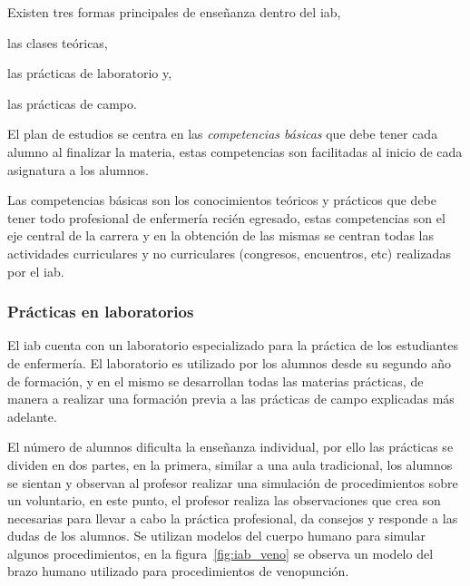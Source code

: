 Existen tres formas principales de enseñanza dentro del \Gls{iab}, 
\begin{enumerate*}[label=\itshape\alph*\upshape.]
\item las clases teóricas, 
\item las prácticas de laboratorio y, 
\item las prácticas de campo.
\end{enumerate*}


El plan de estudios se centra en las \emph{competencias básicas} que debe tener
cada alumno al finalizar la materia, estas competencias son facilitadas al
inicio de cada asignatura a los alumnos.

Las competencias básicas son los conocimientos teóricos y prácticos que debe
tener todo profesional de enfermería recién egresado, estas competencias son el
eje central de la carrera y en la obtención de las mismas se centran todas las
actividades curriculares y no curriculares (congresos, encuentros, etc)
realizadas por el \Gls{iab}.



\subsubsection{Prácticas en laboratorios}
\label{sec:practica_lab}

El \Gls{iab} cuenta con un laboratorio especializado para la práctica de los
estudiantes de enfermería. El laboratorio es utilizado por los alumnos 
desde su segundo año de formación, y en el mismo se desarrollan todas las materias 
prácticas, de manera a realizar una formación previa a las prácticas de campo 
explicadas más adelante.

El número de alumnos dificulta la enseñanza individual, por ello las prácticas se
dividen en dos partes, en la primera, similar a una aula tradicional, los
alumnos se sientan y observan al profesor realizar una simulación de
procedimientos sobre un voluntario, en este punto, el profesor realiza las
observaciones que crea son necesarias para llevar a cabo la práctica
profesional, da consejos y responde a las dudas de los alumnos.
Se utilizan modelos del cuerpo humano para simular
algunos procedimientos, en la figura~\ref{fig:iab_veno} se observa un modelo del
brazo humano utilizado para procedimientos de venopunción.

